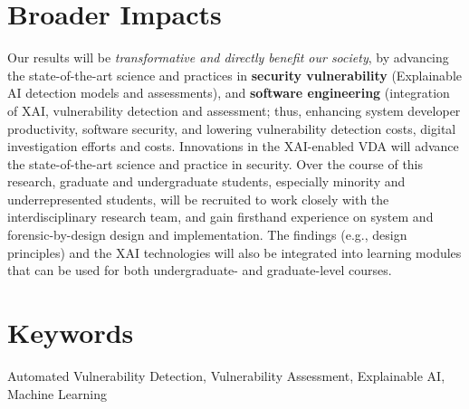 \documentclass[11pt]{article}
\begin{document}
\section{Broader Impacts}

Our results will be {\em transformative and directly benefit our
  society}, by advancing the state-of-the-art science and practices in
{\bf security vulnerability} (Explainable AI detection models and
assessments), and {\bf software engineering} (integration of XAI,
vulnerability detection and assessment; thus, enhancing system
developer productivity, software security, and lowering vulnerability
detection costs, digital investigation efforts and costs.  Innovations
in the XAI-enabled VDA will advance the state-of-the-art science and
practice in security. Over the course of this research, graduate and
undergraduate students, especially minority and underrepresented
students, will be recruited to work closely with the interdisciplinary
research team, and gain firsthand experience on system and
forensic-by-design design and implementation. The findings (e.g.,
design principles) and the XAI technologies will also be integrated
into learning modules that can be used for both undergraduate- and
graduate-level courses.

\section{Keywords}
Automated Vulnerability Detection, Vulnerability Assessment,
Explainable AI, Machine Learning



\end{document}
